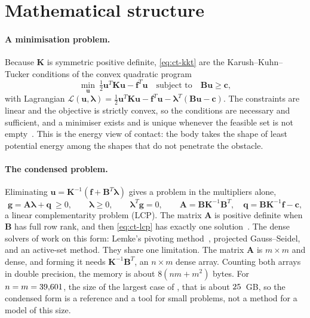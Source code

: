 \section{Mathematical structure}\label{sec:ct-math}

\paragraph{A minimisation problem.}
Because $\bm K$ is symmetric positive definite, \eqref{eq:ct-kkt} are the Karush--Kuhn--Tucker conditions of the convex quadratic program
\begin{equation}\label{eq:ct-qp}
\min_{\bm u}\ \tfrac12\bm u^T\bm K\bm u-\bm f^T\bm u\quad\text{subject to}\quad \bm B\bm u\ge\bm c,
\end{equation}
with Lagrangian $\mathcal L(\bm u,\bm\lambda)=\tfrac12\bm u^T\bm K\bm u-\bm f^T\bm u-\bm\lambda^T(\bm B\bm u-\bm c)$. The constraints are linear and the objective is strictly convex, so the conditions are necessary and sufficient, and a minimiser exists and is unique whenever the feasible set is not empty~\cite{wriggers2006contact}. This is the energy view of contact: the body takes the shape of least potential energy among the shapes that do not penetrate the obstacle.

\paragraph{The condensed problem.}
Eliminating $\bm u=\bm K^{-1}(\bm f+\bm B^T\bm\lambda)$ gives a problem in the multipliers alone,
\begin{equation}\label{eq:ct-lcp}
\bm g=\bm A\bm\lambda+\bm q\ \ge 0,\qquad \bm\lambda\ge0,\qquad \bm\lambda^T\bm g=0,\qquad \bm A=\bm B\bm K^{-1}\bm B^T,\quad \bm q=\bm B\bm K^{-1}\bm f-\bm c,
\end{equation}
a linear complementarity problem (LCP). The matrix $\bm A$ is positive definite when $\bm B$ has full row rank, and then \eqref{eq:ct-lcp} has exactly one solution~\cite{cottle1992lcp}. The dense solvers of \fea{} work on this form: Lemke's pivoting method~\cite{lemke1965bimatrix}, projected Gauss--Seidel, and an active-set method. They share one limitation. The matrix $\bm A$ is $m\times m$ and dense, and forming it needs $\bm K^{-1}\bm B^T$, an $n\times m$ dense array. Counting both arrays in double precision, the memory is about $8(nm+m^2)$ bytes. For $n=m=39{,}601$, the size of the largest case of , that is about $25$~GB, so the condensed form is a reference and a tool for small problems, not a method for a model of this size.

